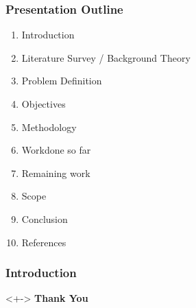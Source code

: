 \documentclass{beamer}
\begin{document}
\begin{frame}
\frametitle{Presentation Outline}
	\begin{enumerate}
	\item Introduction
	\item Literature Survey / Background Theory
	\item Problem Definition
	\item Objectives
	\item Methodology
	\item Workdone so far
	\item Remaining work
	\item Scope
	\item Conclusion
	\item References
	\end{enumerate}
\end{frame}
\begin{frame}
\frametitle{Introduction}
\end{frame}

\begin{frame}
\begin{block}<+->{}
\centering
\huge{\huge{\textbf{Thank You}}}
\end{block}
\end{frame}
\end{document}
